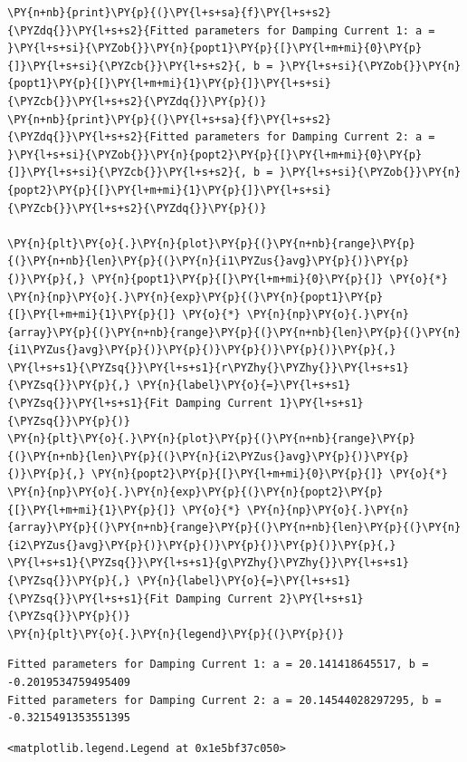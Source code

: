 \begin{tcolorbox}[breakable, size=fbox, boxrule=1pt, pad at break*=1mm,colback=cellbackground, colframe=cellborder]
\begin{Verbatim}[commandchars=\\\{\}]
\PY{n+nb}{print}\PY{p}{(}\PY{l+s+sa}{f}\PY{l+s+s2}{\PYZdq{}}\PY{l+s+s2}{Fitted parameters for Damping Current 1: a = }\PY{l+s+si}{\PYZob{}}\PY{n}{popt1}\PY{p}{[}\PY{l+m+mi}{0}\PY{p}{]}\PY{l+s+si}{\PYZcb{}}\PY{l+s+s2}{, b = }\PY{l+s+si}{\PYZob{}}\PY{n}{popt1}\PY{p}{[}\PY{l+m+mi}{1}\PY{p}{]}\PY{l+s+si}{\PYZcb{}}\PY{l+s+s2}{\PYZdq{}}\PY{p}{)}
\PY{n+nb}{print}\PY{p}{(}\PY{l+s+sa}{f}\PY{l+s+s2}{\PYZdq{}}\PY{l+s+s2}{Fitted parameters for Damping Current 2: a = }\PY{l+s+si}{\PYZob{}}\PY{n}{popt2}\PY{p}{[}\PY{l+m+mi}{0}\PY{p}{]}\PY{l+s+si}{\PYZcb{}}\PY{l+s+s2}{, b = }\PY{l+s+si}{\PYZob{}}\PY{n}{popt2}\PY{p}{[}\PY{l+m+mi}{1}\PY{p}{]}\PY{l+s+si}{\PYZcb{}}\PY{l+s+s2}{\PYZdq{}}\PY{p}{)}

\PY{n}{plt}\PY{o}{.}\PY{n}{plot}\PY{p}{(}\PY{n+nb}{range}\PY{p}{(}\PY{n+nb}{len}\PY{p}{(}\PY{n}{i1\PYZus{}avg}\PY{p}{)}\PY{p}{)}\PY{p}{,} \PY{n}{popt1}\PY{p}{[}\PY{l+m+mi}{0}\PY{p}{]} \PY{o}{*} \PY{n}{np}\PY{o}{.}\PY{n}{exp}\PY{p}{(}\PY{n}{popt1}\PY{p}{[}\PY{l+m+mi}{1}\PY{p}{]} \PY{o}{*} \PY{n}{np}\PY{o}{.}\PY{n}{array}\PY{p}{(}\PY{n+nb}{range}\PY{p}{(}\PY{n+nb}{len}\PY{p}{(}\PY{n}{i1\PYZus{}avg}\PY{p}{)}\PY{p}{)}\PY{p}{)}\PY{p}{)}\PY{p}{,} \PY{l+s+s1}{\PYZsq{}}\PY{l+s+s1}{r\PYZhy{}\PYZhy{}}\PY{l+s+s1}{\PYZsq{}}\PY{p}{,} \PY{n}{label}\PY{o}{=}\PY{l+s+s1}{\PYZsq{}}\PY{l+s+s1}{Fit Damping Current 1}\PY{l+s+s1}{\PYZsq{}}\PY{p}{)}
\PY{n}{plt}\PY{o}{.}\PY{n}{plot}\PY{p}{(}\PY{n+nb}{range}\PY{p}{(}\PY{n+nb}{len}\PY{p}{(}\PY{n}{i2\PYZus{}avg}\PY{p}{)}\PY{p}{)}\PY{p}{,} \PY{n}{popt2}\PY{p}{[}\PY{l+m+mi}{0}\PY{p}{]} \PY{o}{*} \PY{n}{np}\PY{o}{.}\PY{n}{exp}\PY{p}{(}\PY{n}{popt2}\PY{p}{[}\PY{l+m+mi}{1}\PY{p}{]} \PY{o}{*} \PY{n}{np}\PY{o}{.}\PY{n}{array}\PY{p}{(}\PY{n+nb}{range}\PY{p}{(}\PY{n+nb}{len}\PY{p}{(}\PY{n}{i2\PYZus{}avg}\PY{p}{)}\PY{p}{)}\PY{p}{)}\PY{p}{)}\PY{p}{,} \PY{l+s+s1}{\PYZsq{}}\PY{l+s+s1}{g\PYZhy{}\PYZhy{}}\PY{l+s+s1}{\PYZsq{}}\PY{p}{,} \PY{n}{label}\PY{o}{=}\PY{l+s+s1}{\PYZsq{}}\PY{l+s+s1}{Fit Damping Current 2}\PY{l+s+s1}{\PYZsq{}}\PY{p}{)}
\PY{n}{plt}\PY{o}{.}\PY{n}{legend}\PY{p}{(}\PY{p}{)}
\end{Verbatim}
\end{tcolorbox}

    \begin{Verbatim}[commandchars=\\\{\}]
Fitted parameters for Damping Current 1: a = 20.141418645517, b =
-0.2019534759495409
Fitted parameters for Damping Current 2: a = 20.14544028297295, b =
-0.3215491353551395
    \end{Verbatim}

            \begin{tcolorbox}[breakable, size=fbox, boxrule=.5pt, pad at break*=1mm, opacityfill=0]
\begin{Verbatim}[commandchars=\\\{\}]
<matplotlib.legend.Legend at 0x1e5bf37c050>
\end{Verbatim}
\end{tcolorbox}
        
